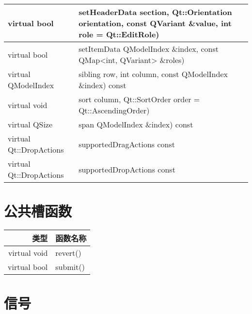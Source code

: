\begin{longtable}{|m{10em}|m{30em}|}
\hline
virtual bool	&setHeaderData section, Qt::Orientation orientation, const QVariant \&value, int role = Qt::EditRole)\\
\hline
virtual bool	&setItemData QModelIndex \&index, const QMap<int, QVariant> \&roles)\\
\hline
virtual QModelIndex&	sibling row, int column, const QModelIndex \&index) const\\
\hline
virtual void	&sort column, Qt::SortOrder order = Qt::AscendingOrder)\\
\hline
virtual QSize	&span QModelIndex \&index) const\\
\hline
virtual Qt::DropActions	&supportedDragActions const\\
\hline
virtual Qt::DropActions	&supportedDropActions const\\
\hline
\end{longtable}

\splitLine

\section{公共槽函数}

\begin{tabular}{|r|l|}
\hline
类型 & 函数名称 \\
\hline
virtual void	&revert()\\
\hline
virtual bool	&submit()\\
\hline
\end{tabular}

\splitLine

\section{信号}

